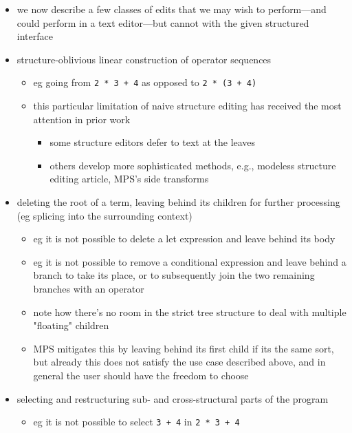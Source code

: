 
\begin{itemize}
\item
  we now describe a few classes of edits that we may wish to perform---and
  could perform in a text editor---but cannot with the given structured
  interface
\item structure-oblivious linear construction of operator sequences
  \begin{itemize}
    \item eg going from \texttt{2 * 3 + 4} as opposed to \texttt{2 * (3 + 4)}
    \item this particular limitation of naive structure editing has received
      the most attention in prior work
    \begin{itemize}
      \item some structure editors defer to text at the leaves
      \item others develop more sophisticated methods, e.g.,
        modeless structure editing article,
        MPS's side transforms
    \end{itemize}
  \end{itemize}
\item deleting the root of a term,
  leaving behind its children for further processing
  (eg splicing into the surrounding context)
  \begin{itemize}
    \item eg it is not possible to delete a let expression and leave behind its body
    \item eg it is not possible to remove a conditional expression
      and leave behind a branch to take its place, or to subsequently join the
      two remaining branches with an operator
    \item note how there's no room in the strict tree structure to deal with
      multiple "floating" children
    \item MPS mitigates this by leaving behind its first child if its the
      same sort, but already this does not satisfy the use case described above,
      and in general the user should have the freedom to choose
  \end{itemize}
\item selecting and restructuring sub- and cross-structural
  parts of the program
  \begin{itemize}
    \item eg it is not possible to select \texttt{3 + 4} in \texttt{2 * 3 + 4}

\end{itemize}
\end{itemize}
